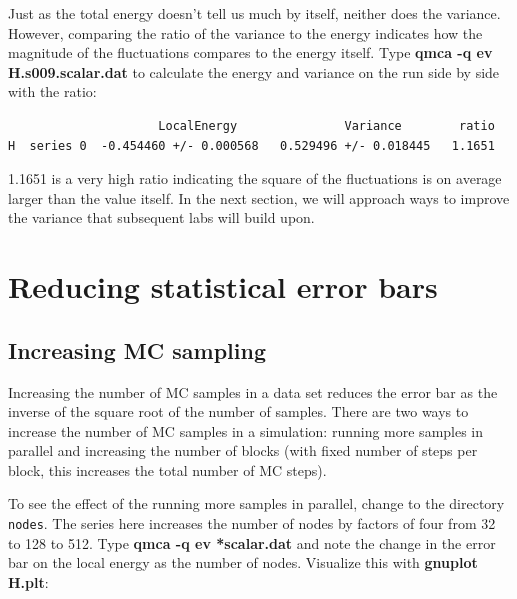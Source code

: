 Just as the total energy doesn't tell us much by itself, neither does the
variance.  However, comparing the ratio of the variance to the energy indicates
how the magnitude of the fluctuations compares to the energy itself.   Type
\textbf{qmca -q ev H.s009.scalar.dat} to calculate the energy and variance on
the run side by side with the ratio:

\begin{shaded}
\begin{verbatim}
                     LocalEnergy               Variance        ratio
H  series 0  -0.454460 +/- 0.000568   0.529496 +/- 0.018445   1.1651
\end{verbatim}
\end{shaded}

1.1651 is a very high ratio indicating the square of the fluctuations is on
average larger than the value itself.  In the next section, we will approach
ways to improve the variance that subsequent labs will build upon.  

\section{Reducing statistical error bars}

\subsection{Increasing MC sampling}

Increasing the number of MC samples in a data set reduces the error bar as the
inverse of the square root of the number of samples.  There are two ways to
increase the number of MC samples in a simulation: running more samples in
parallel and increasing the number of blocks (with fixed number of steps per
block, this increases the total number of MC steps).

To see the effect of the running more samples in parallel, change to the
directory \texttt{nodes}.  The series here increases the number of nodes by
factors of four from 32 to 128 to 512.  Type \textbf{qmca -q ev *scalar.dat}
and note the change in the error bar on the local energy as the number of
nodes.  Visualize this with \textbf{gnuplot H.plt}:

